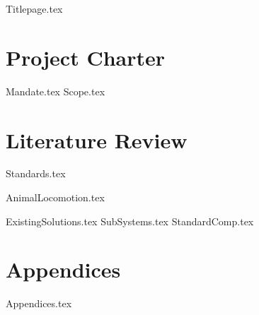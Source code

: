 \documentclass[letterpaper,12pt,onecolumn,titlepage,twoside]{article}
\begin{document}

{Titlepage.tex}

\clearpage\mbox{}\clearpage %


\tableofcontents

\newpage

\listoffigures
\listoftables

\newpage


\section{Project Charter} \label{sec:charter}
{Mandate.tex}
{Scope.tex}

\newpage

\section{Literature Review} \label{sec:lit_review}

{Standards.tex}

{AnimalLocomotion.tex}

{ExistingSolutions.tex}
{SubSystems.tex}
{StandardComp.tex}

\newpage




\newpage

\appendix

\section{Appendices} \label{sec:appendices}
{Appendices.tex}
\end{document}

